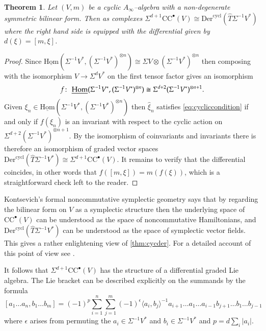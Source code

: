 \documentclass[british]{amsart}
\theoremstyle{plain}
\newtheorem{theorem}{Theorem}[section]
\theoremstyle{definition}
{
\newaliascnt{{definition}}{theorem}\newtheorem{{definition}}[{definition}]{{Definition}}\aliascntresetthe{{definition}}\expandafterautorefname\endcsname{{Definition}}}
{
\newaliascnt{{remark}}{theorem}\newtheorem{{remark}}[{remark}]{{Remark}}\aliascntresetthe{{remark}}\expandafterautorefname\endcsname{{Remark}}}
{
\newaliascnt{{example}}{theorem}\newtheorem{{example}}[{example}]{{Example}}\aliascntresetthe{{example}}\expandafterautorefname\endcsname{{Example}}}
{
\newaliascnt{{examples}}{theorem}\newtheorem{{examples}}[{examples}]{{Examples}}\aliascntresetthe{{examples}}\expandafterautorefname\endcsname{{Examples}}}
{
\newaliascnt{{notation}}{theorem}\newtheorem{{notation}}[{notation}]{{Notation}}\aliascntresetthe{{notation}}\expandafterautorefname\endcsname{{Notation}}}
{
\newaliascnt{{convention}}{theorem}\newtheorem{{convention}}[{convention}]{{Convention}}\aliascntresetthe{{convention}}\expandafterautorefname\endcsname{{Convention}}}
\numberwithin{equation}{section}
\numberwithin{figure}{section}
\begin{document}
\begin{theorem}\label{thm:cycder}
Let $(V,m)$ be a cyclic $A_\infty$--algebra with a \emph{non-degenerate} symmetric bilinear form. Then as complexes $\Sigma^{d+1}{\mathrm{CC}}^\bullet(V) \cong {\mathrm{Der}}^{\mathrm{cycl}}(\widehat{T}\Sigma^{-1}V^*)$ where the right hand side is equipped with the differential given by $d(\xi) = [m,\xi]$.
\end{theorem}

\begin{proof}
Since $\operatorname{\underline{Hom}}(\Sigma^{-1}V^*, (\Sigma^{-1}V^*)^{\otimes n})\cong \Sigma V \otimes (\Sigma^{-1}V^*)^{\otimes n}$ then composing with the isomorphism $V \rightarrow \Sigma^{d}V^*$ on the first tensor factor gives an isomorphism
\[
f{\colon\thinspace}\operatorname{\underline{Hom}}(\Sigma^{-1}V^*, (\Sigma^{-1}V^*)^{\otimes n})\cong \Sigma^{d+2} (\Sigma^{-1}V^*)^{\otimes n+1}.
\]
Given $\xi_n\in \operatorname{\underline{Hom}}(\Sigma^{-1}V^*, (\Sigma^{-1}V^*)^{\otimes n})$ then $\hat{\xi}_n$ satisfies \autoref{eq:cycliccondition} if and only if $f(\xi_n)$ is an invariant with respect to the cyclic action on $\Sigma^{d+2} (\Sigma^{-1}V^*)^{\otimes n+1}$. By the isomorphism of coinvariants and invariants there is therefore an isomorphism of graded vector spaces ${\mathrm{Der}}^{\mathrm{cycl}}(\widehat{T}\Sigma^{-1}V^*)\cong \Sigma^{d+1}{\mathrm{CC}}^\bullet(V)$. It remains to verify that the differential coincides, in other words that $f([m,\xi]) = m(f(\xi))$, which is a straightforward check left to the reader.
\end{proof}

\begin{remark}
Kontsevich's formal noncommutative symplectic geometry \cite{kontsevich1993:ncsg} says that by regarding the bilinear form on $V$ as a symplectic structure then the underlying space of ${\mathrm{CC}}^{\bullet}(V)$ can be understood as the space of noncommutative Hamiltonians, and ${\mathrm{Der}}^{\mathrm{cycl}}(\widehat{T}\Sigma^{-1}V^*)$ can be understood as the space of symplectic vector fields. This gives a rather enlightening view of \autoref{thm:cycder}. For a detailed account of this point of view see \cite{hamiltonlazarev:homalgsncg}.
\end{remark}

\begin{remark}\label{rem:cyclie}
It follows that $\Sigma^{d+1}{\mathrm{CC}}^\bullet(V)$ has the structure of a differential graded Lie algebra. The Lie bracket can be described explicitly on the summands by the formula
\[
[a_1\dots a_n, b_1\dots b_m ] = (-1)^p\sum_{i=1}^{n}\sum_{j=1}^{m}(-1)^{\epsilon}\langle a_i, b_j \rangle^{-1}  a_{i+1}\dots a_1\ldots a_{i-1} b_{j+1}\dots b_1\dots b_{j-1}
\]
where $\epsilon$ arises from permuting the $a_i\in\Sigma^{-1}V^*$ and $b_i\in\Sigma^{-1}V^*$ and $p=d\sum_i {\lvert {a_i} \rvert}$.
\end{remark}
\end{document}
